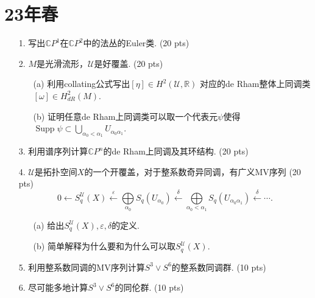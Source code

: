 \section{23年春}
\begin{enumerate}
    \item[1.] 写出$\mathbb{C}P^1$在$\mathbb{C}P^2$中的法丛的Euler类. (20 pts)
    \item[2.] $M$是光滑流形，$\mathscr{U}$是好覆盖. (20 pts)
    \begin{itemize}
        \item[(a)] 利用collating公式写出$[\eta]\in H^2(\mathscr{U},\mathbb{R})$ 
        对应的de Rham整体上同调类$[\omega]\in H^2_{dR}(M)$.
        \item[(b)] 证明任意de Rham上同调类可以取一个代表元$\psi$使得$\operatorname{Supp} \psi\subset \bigcup\limits_{\alpha_0<\alpha_1} U_{\alpha_0 \alpha_1}$.
    \end{itemize}
    \item[3.]  利用谱序列计算$\mathbb{C}P^n$的de Rham上同调及其环结构. (20 pts)
    \item[4.] $\mathscr{U}$是拓扑空间$X$的一个开覆盖，对于整系数奇异同调，有广义MV序列 (20 pts)
            $$0\leftarrow S^{\mathscr{U}}_q(X) \xleftarrow{\varepsilon} \bigoplus\limits_{\alpha_0} S_q(U_{\alpha_0}) \xleftarrow{\delta} \bigoplus\limits_{\alpha_0<\alpha_1} S_q(U_{\alpha_0\alpha_1})\xleftarrow{\delta} \cdots.$$
    \begin{itemize}
        \item[(a)] 给出$S^{\mathscr{U}}_q(X), \varepsilon, \delta$的定义.
        \item[(b)] 简单解释为什么要和为什么可以取$S^{\mathscr{U}}_q(X)$.
    \end{itemize}
\item[5.] 利用整系数同调的MV序列计算$S^3 \vee S^6$的整系数同调群. (10 pts)
\item[6.] 尽可能多地计算$S^3 \vee S^6$的同伦群. (10 pts)
\end{enumerate}